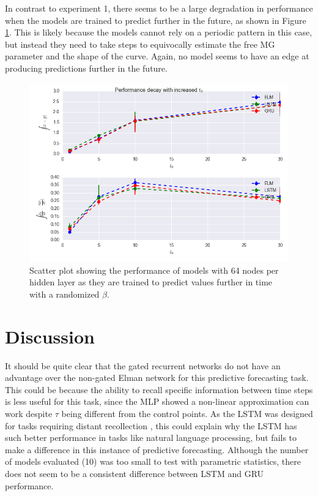 \documentclass[11pt]{article}
\begin{document}
In contrast to experiment 1, there seems to be a large degradation in
performance when the models are trained to predict further in the
future, as shown in Figure \ref{fig:mg2_save}. This is likely because the models cannot rely on a periodic
pattern in this case, but instead they need to take steps to
equivocally estimate the free MG parameter and the shape of the curve. Again,
no model seems to have an edge at producing predictions further in the future. 

  \begin{figure}
    \begin{center}
   \includegraphics[width=.96\textwidth]{figures/mg2_save.png}      
    \caption{Scatter plot showing the performance of models with 64 nodes
      per hidden layer as they are trained to predict values further
      in time with a randomized $\beta$.}
    \label{fig:mg2_save}
    \end{center}
  \end{figure}

\section {Discussion}
It should be quite clear that the gated recurrent networks do not have
an advantage over the non-gated Elman network for this predictive
forecasting task. This could be because the ability to recall specific 
information between time steps is less useful for this task, since the
MLP showed a non-linear approximation can work despite $\tau$ being
different from the control points. As the LSTM was designed for tasks requiring distant recollection
\cite{LSTM}, this could explain why the LSTM has such better
performance in tasks like natural language processing, but fails to make a difference in this
instance of predictive forecasting. Although the number of models
evaluated (10) was too small to test with parametric statistics, there
does not seem to be a consistent difference between LSTM and GRU performance.
\end{document}

